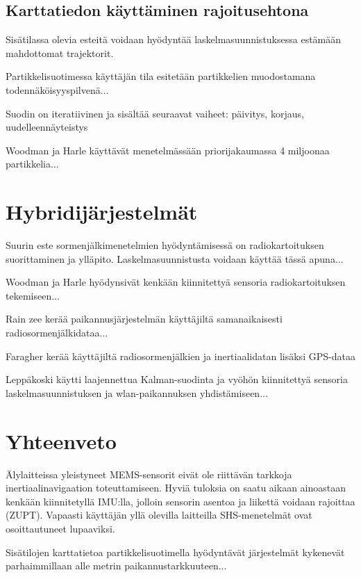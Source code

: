 \subsection{Karttatiedon käyttäminen rajoitusehtona}

Sisätilassa olevia esteitä voidaan hyödyntää laskelmasuunnistuksessa
estämään mahdottomat trajektorit.

Partikkelisuotimessa käyttäjän tila
esitetään partikkelien muodostamana todennäköisyyspilvenä...

Suodin on iteratiivinen ja sisältää seuraavat vaiheet: päivitys, korjaus,
uudelleennäyteistys

Woodman ja Harle käyttävät menetelmässään \cite{woodman2009rf} priorijakaumassa
4 miljoonaa partikkelia...

\section{Hybridijärjestelmät}

Suurin este sormenjälkimenetelmien hyödyntämisessä on radiokartoituksen
suorittaminen ja ylläpito. Laskelmasuunnistusta voidaan käyttää tässä apuna...

Woodman ja Harle hyödynsivät kenkään kiinnitettyä sensoria radiokartoituksen
tekemiseen...

Rain zee kerää paikannusjärjestelmän käyttäjiltä samanaikaisesti
radiosormenjälkidataa...

Faragher \cite{faragher2012opportunistic} kerää käyttäjiltä radiosormenjälkien
ja inertiaalidatan lisäksi GPS-dataa

Leppäkoski \cite{leppakoski2013pedestrian} käytti laajennettua Kalman-suodinta
ja vyöhön kiinnitettyä sensoria laskelmasuunnistuksen ja
wlan-paikannuksen yhdistämiseen...

\section{Yhteenveto}

Älylaitteissa yleistyneet MEMS-sensorit eivät ole riittävän tarkkoja
inertiaalinavigaation toteuttamiseen. Hyviä tuloksia on saatu aikaan
ainoastaan kenkään kiinnitetyllä IMU:lla, jolloin sensorin asentoa ja liikettä
voidaan rajoittaa (ZUPT). Vapaasti käyttäjän yllä olevilla laitteilla
SHS-menetelmät ovat osoittautuneet lupaaviksi.

Sisätilojen karttatietoa partikkelisuotimella hyödyntävät järjestelmät
kykenevät parhaimmillaan alle metrin paikannustarkkuuteen...

